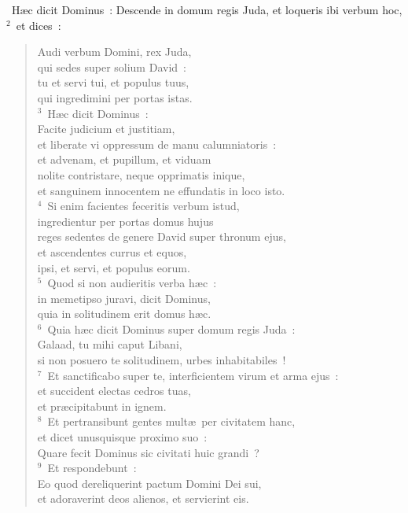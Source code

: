 ~H\ae c dicit Dominus~: Descende in domum regis Juda, et loqueris ibi verbum hoc,
${}^{2}$~et dices~: \begin{flushleft}\begin{verse}Audi verbum Domini, rex Juda,\\ qui sedes super solium David~:\\ tu et servi tui, et populus tuus,\\ qui ingredimini per portas istas.\\
${}^{3}$~H\ae c dicit Dominus~:\\ Facite judicium et justitiam,\\ et liberate vi oppressum de manu calumniatoris~:\\ et advenam, et pupillum, et viduam\\ nolite contristare, neque opprimatis inique,\\ et sanguinem innocentem ne effundatis in loco isto.\\
${}^{4}$~Si enim facientes feceritis verbum istud,\\ ingredientur per portas domus hujus\\ reges sedentes de genere David super thronum ejus,\\ et ascendentes currus et equos,\\ ipsi, et servi, et populus eorum.\\
${}^{5}$~Quod si non audieritis verba h\ae c~:\\ in memetipso juravi, dicit Dominus,\\ quia in solitudinem erit domus h\ae c.\\
${}^{6}$~Quia h\ae c dicit Dominus super domum regis Juda~:\\ Galaad, tu mihi caput Libani,\\ si non posuero te solitudinem, urbes inhabitabiles~!\\
${}^{7}$~Et sanctificabo super te, interficientem virum et arma ejus~:\\ et succident electas cedros tuas,\\ et pr\ae cipitabunt in ignem.\\
${}^{8}$~Et pertransibunt gentes mult\ae\ per civitatem hanc,\\ et dicet unusquisque proximo suo~:\\ Quare fecit Dominus sic civitati huic grandi~?\\
${}^{9}$~Et respondebunt~:\\ Eo quod dereliquerint pactum Domini Dei sui,\\ et adoraverint deos alienos, et servierint eis.\\

\end{verse}
\end{flushleft}
